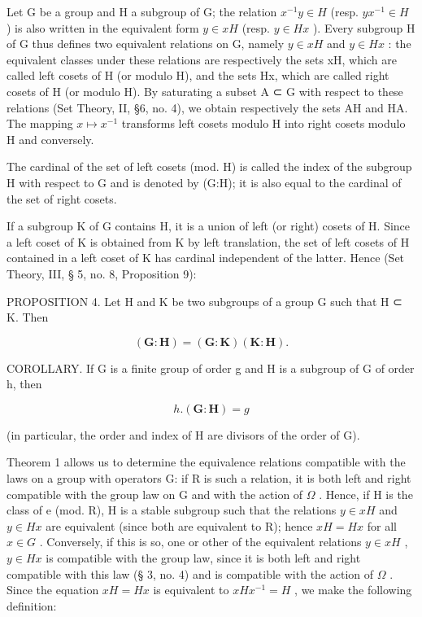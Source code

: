 Let G be a group and H a subgroup of G; the relation \(x^{-1}y \in H\) (resp. \(yx^{-1} \in H\) ) is also written in the equivalent form \(y \in xH\) (resp. \(y \in Hx\) ). Every subgroup H of G thus defines two equivalent relations on G, namely \(y \in xH\) and \(y \in Hx\) : the equivalent classes under these relations are respectively the sets xH, which are called left cosets of H (or modulo H), and the sets Hx, which are called right cosets of H (or modulo H). By saturating a subset A ⊂ G with respect to these relations (Set Theory, II, §6, no. 4), we obtain respectively the sets AH and HA. The mapping \(x \mapsto x^{-1}\) transforms left cosets modulo H into right cosets modulo H and conversely.

The cardinal of the set of left cosets (mod. H) is called the index of the subgroup H with respect to G and is denoted by (G:H); it is also equal to the cardinal of the set of right cosets.

If a subgroup K of G contains H, it is a union of left (or right) cosets of H. Since a left coset of K is obtained from K by left translation, the set of left cosets of H contained in a left coset of K has cardinal independent of the latter. Hence (Set Theory, III, § 5, no. 8, Proposition 9):

PROPOSITION 4. Let H and K be two subgroups of a group G such that H ⊂ K. Then

\[
(\mathbf {G}: \mathbf {H}) = (\mathbf {G}: \mathbf {K}) (\mathbf {K}: \mathbf {H}).\tag{2}
\]

COROLLARY. If G is a finite group of order g and H is a subgroup of G of order h, then

\[
h. (\mathbf {G}: \mathbf {H}) = g\tag{3}
\]

(in particular, the order and index of H are divisors of the order of G).

Theorem 1 allows us to determine the equivalence relations compatible with the laws on a group with operators G: if R is such a relation, it is both left and right compatible with the group law on G and with the action of \(\Omega\) . Hence, if H is the class of e (mod. R), H is a stable subgroup such that the relations \(y \in xH\) and \(y \in Hx\) are equivalent (since both are equivalent to R); hence \(xH = Hx\) for all \(x \in G\) . Conversely, if this is so, one or other of the equivalent relations \(y \in xH\) , \(y \in Hx\) is compatible with the group law, since it is both left and right compatible with this law (§ 3, no. 4) and is compatible with the action of \(\Omega\) . Since the equation \(xH = Hx\) is equivalent to \(xHx^{-1} = H\) , we make the following definition:

